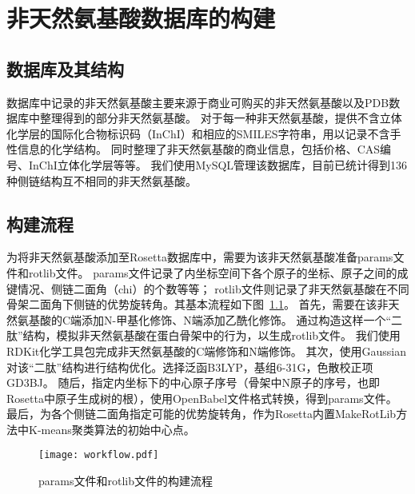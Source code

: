 
\chapter{非天然氨基酸数据库的构建}

\section{数据库及其结构}

数据库中记录的非天然氨基酸主要来源于商业可购买的非天然氨基酸以及PDB数据库中整理得到的部分非天然氨基酸。
对于每一种非天然氨基酸，提供不含立体化学层的国际化合物标识码（InChI）和相应的SMILES字符串，用以记录不含手性信息的化学结构。
同时整理了非天然氨基酸的商业信息，包括价格、CAS编号、InChI立体化学层等等。
我们使用MySQL管理该数据库，目前已统计得到136种侧链结构互不相同的非天然氨基酸。



\section{构建流程}

为将非天然氨基酸添加至Rosetta数据库中，需要为该非天然氨基酸准备params文件和rotlib文件。
params文件记录了内坐标空间下各个原子的坐标、原子之间的成键情况、侧链二面角（chi）的个数等等；
rotlib文件则记录了非天然氨基酸在不同骨架二面角下侧链的优势旋转角。其基本流程如下图~\ref{fig:workflow}。
首先，需要在该非天然氨基酸的C端添加N-甲基化修饰、N端添加乙酰化修饰。
通过构造这样一个“二肽”结构，模拟非天然氨基酸在蛋白骨架中的行为，以生成rotlib文件。
我们使用RDKit化学工具包完成非天然氨基酸的C端修饰和N端修饰。
其次，使用Gaussian对该“二肽”结构进行结构优化。选择泛函B3LYP，基组6-31G，色散校正项GD3BJ。
随后，指定内坐标下的中心原子序号（骨架中N原子的序号，也即Rosetta中原子生成树的根），使用OpenBabel文件格式转换，得到params文件。
最后，为各个侧链二面角指定可能的优势旋转角，作为Rosetta内置MakeRotLib方法中K-means聚类算法的初始中心点。
\begin{figure}
  \centering
  \texttt{[image: workflow.pdf]}
  \caption{params文件和rotlib文件的构建流程}
  \label{fig:workflow}
\end{figure}

